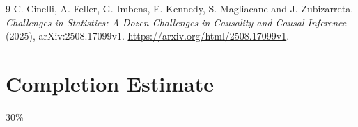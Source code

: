 \documentclass[11pt]{article}
\theoremstyle{definition}
\begin{document}
\begin{thebibliography}{9}
 C. Cinelli, A. Feller, G. Imbens, E. Kennedy, S. Magliacane and J. Zubizarreta.
\emph{Challenges in Statistics: A Dozen Challenges in Causality and Causal Inference} (2025), arXiv:2508.17099v1.
\url{https://arxiv.org/html/2508.17099v1}.
\end{thebibliography}
\section{Completion Estimate}
30\%
\end{document}

